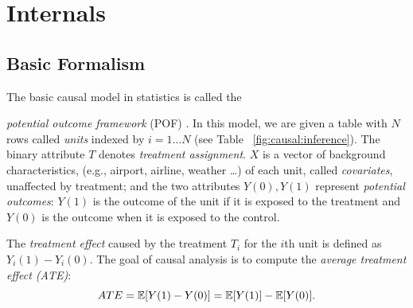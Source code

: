 \vspace{-.2cm}
\section{Internals}
\subsection{Basic Formalism}

The basic causal model in statistics is called the
{\em potential outcome framework} (POF) \cite{Rubin2005}.
In this model, we are given a table with $N$ rows called {\em units} indexed by $i=1 \ldots N$ (see
Table~ \ref{fig:causal:inference}).  The binary attribute $T$ denotes {\em treatment assignment}.
$X$ is a vector of
background characteristics, (e.g., airport, airline, weather \ldots) of each unit,
called {\em covariates}, unaffected by treatment; and the two
attributes $Y(0), Y(1)$ represent {\em potential outcomes}: $Y(1)$ is
the outcome of the unit if it is exposed to the treatment and $Y(0)$
is the outcome when it is exposed to the control.

The {\em treatment effect}
caused by the treatment $T_i$ for the $i$th unit  is defined as $Y_i(1)-Y_i(0)$.
The goal of causal analysis is to compute the {\em average treatment
  effect (ATE)}:   $$ATE = \mathbb{E}[Y(1)-Y(0)] = \mathbb{E}[Y(1)] - \mathbb{E}[Y(0)].$$


